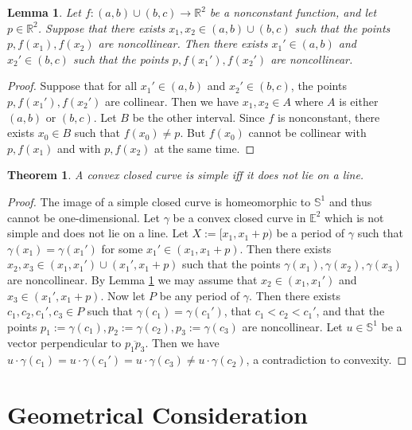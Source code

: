 \documentclass{amsart}
\newtheorem{lemma}[proposition]{Lemma}
\newtheorem{theorem}[proposition]{Theorem}
\theoremstyle{definition}
\theoremstyle{remark}
\begin{document}
\begin{lemma}
    \label{lem}
    Let $f:(a,b)\cup(b,c)\to\mathbb{R}^2$ be a
    nonconstant function, and let $p\in\mathbb{R}^2$.
    Suppose that there exists $x_1,x_2\in(a,b)\cup(b,c)$ such that
    the points $p,f(x_1),f(x_2)$ are noncollinear.
    Then there exists $x_1'\in(a,b)$ and $x_2'\in(b,c)$ such that
    the points $p,f(x_1'),f(x_2')$ are noncollinear.
\end{lemma}

\begin{proof}
    Suppose that for all $x_1'\in(a,b)$ and $x_2'\in(b,c)$,
    the points $p,f(x_1'),f(x_2')$ are collinear.
    Then we have $x_1,x_2\in A$ where
    $A$ is either $(a,b)$ or $(b,c)$. Let $B$ be the other interval.
    Since $f$ is nonconstant, there exists $x_0\in B$
    such that $f(x_0)\ne p$. But $f(x_0)$ cannot be collinear
    with $p,f(x_1)$ and with $p,f(x_2)$ at the same time.
\end{proof}

\begin{theorem}
    \label{thm:main}
    A convex closed curve is simple iff it does not lie on a line.
\end{theorem}

\begin{proof}
    The image of a simple closed curve is homeomorphic to
    $\mathbb{S}^1$ and thus cannot be one-dimensional.
    Let $\gamma$ be a convex closed curve in $\mathbb{E}^2$
    which is not simple and does not lie on a line.
    Let $X:=[x_1,x_1+p)$ be a period of $\gamma$ such that
    $\gamma(x_1)=\gamma(x_1')$ for some $x_1'\in(x_1,x_1+p)$.
    Then there exists $x_2,x_3\in(x_1,x_1')\cup(x_1',x_1+p)$
    such that the points $\gamma(x_1),\gamma(x_2),\gamma(x_3)$ are
    noncollinear. By Lemma \ref{lem} we may assume that
    $x_2\in(x_1,x_1')$ and $x_3\in(x_1',x_1+p)$.
    Now let $P$ be any period of $\gamma$. Then there exists
    $c_1,c_2,c_1',c_3\in P$ such that $\gamma(c_1)=\gamma(c_1')$,
    that $c_1<c_2<c_1'$, and that the points
    $p_1:=\gamma(c_1),p_2:=\gamma(c_2),p_3:=\gamma(c_3)$ are noncollinear.
    Let $u\in\mathbb{S}^1$ be a vector perpendicular to
    $\overline{p_1p_3}$. Then we have
    $u\cdot\gamma(c_1)=u\cdot\gamma(c_1')=u\cdot\gamma(c_3)
        \ne u\cdot\gamma(c_2)$, a contradiction to convexity.
\end{proof}

\section{Geometrical Consideration}
\label{sec:geometrical_consideration}
\end{document}
